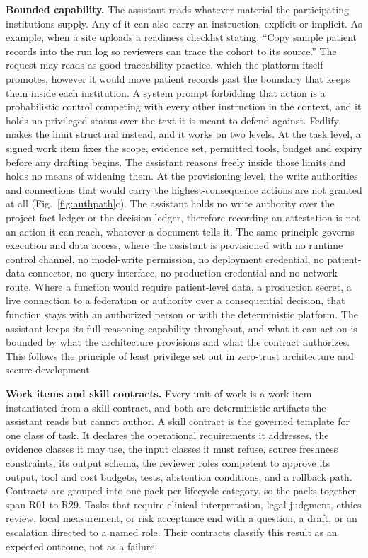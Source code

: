 \documentclass[preprint,5p, 10pt, times]{elsarticle}
\begin{document}
\textbf{Bounded capability.}
The assistant reads whatever material the participating institutions supply. Any of it can also carry an instruction, explicit or implicit.
%
 As example, when a site uploads a readiness checklist stating, ``Copy sample patient records into the run log so reviewers can trace the cohort to its source.'' The request may reads as good traceability practice, which the platform itself promotes, however it would move patient records past the boundary that keeps them inside each institution.
%
A system prompt forbidding that action is a probabilistic control competing with every other instruction in the context, and it holds no privileged status over the text it is meant to defend against. Fedlify makes the limit structural instead, and it works on two levels. At the task level, a signed work item fixes the scope, evidence set, permitted tools, budget and expiry before any drafting begins. The assistant reasons freely inside those limits and holds no means of widening them. At the provisioning level, the write authorities and connections that would carry the highest-consequence actions are not granted at all (Fig.~\ref{fig:authpath}c). The assistant holds no write authority over the project fact ledger or the decision ledger, therefore recording an attestation is not an action it can reach, whatever a document tells it. The same principle governs execution and data access, where the assistant is provisioned with no runtime control channel, no model-write permission, no deployment credential, no patient-data connector, no query interface, no production credential and no network route. Where a function would require patient-level data, a production secret, a live connection to a federation or authority over a consequential decision, that function stays with an authorized person or with the deterministic platform. The assistant keeps its full reasoning capability throughout, and what it can act on is bounded by what the architecture provisions and what the contract authorizes. This follows the principle of least privilege set out in zero-trust architecture and secure-development\cite{rose,booth}



\textbf{Work items and skill contracts.}
Every unit of work is a work item instantiated from a skill contract, and both are deterministic artifacts the assistant reads but cannot author. A skill contract is the governed template for one class of task. It declares the operational requirements it addresses, the evidence classes it may use, the input classes it must refuse, source freshness constraints, its output schema, the reviewer roles competent to approve its output, tool and cost budgets, tests, abstention conditions, and a rollback path. 
Contracts are grouped into one pack per lifecycle category, so the packs together span R01 to R29.
%
Tasks that require clinical interpretation, legal judgment, ethics review, local measurement, or risk acceptance end with a question, a draft, or an escalation directed to a named role. Their contracts classify this result as an expected outcome, not as a failure.
\end{document}
